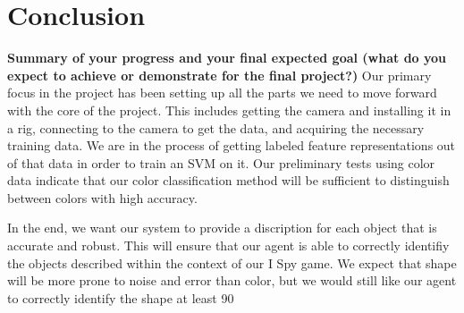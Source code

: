 \documentclass[11pt]{article}
\newcommand{\xxx}[1]{{\bf \color{red} #1}}
\begin{document}
\section{Conclusion}
\xxx{Summary of your progress and your final expected goal (what do you expect
    to achieve or demonstrate for the final project?)}
Our primary focus in the project has been setting up all the parts we need to move forward with the core of the project. This includes getting the camera and installing it in a rig, connecting to the camera to get the data, and acquiring the necessary training data. We are in the process of getting labeled feature representations out of that data in order to train an SVM on it. Our preliminary tests using color data indicate that our color classification method will be sufficient to distinguish between colors with high accuracy.

In the end, we want our system to provide a discription for each object that is accurate and robust. This will ensure that our agent is able to correctly identifiy the objects described within the context of our I Spy game. We expect that shape will be more prone to noise and error than color, but we would still like our agent to correctly identify the shape at least 90%



\end{document}

